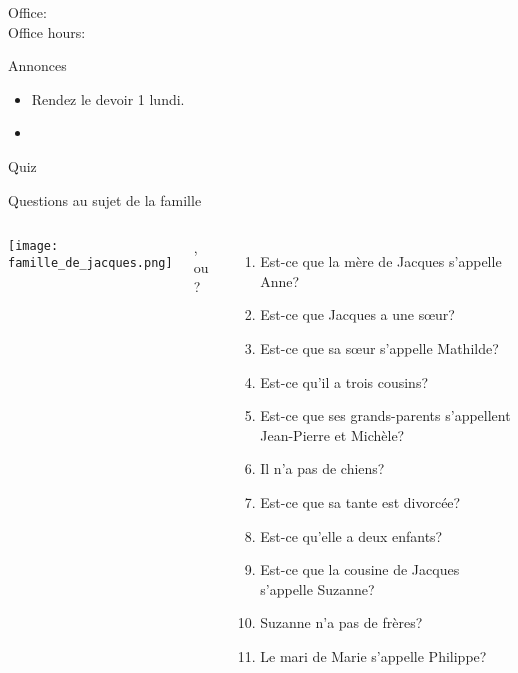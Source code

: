 \documentclass{beamer}
\subtitle[Oui ou non]{Les questions oui ou non}
\begin{document}
  \begin{frame}
    \titlepage
    \tiny{Office: \\
          Office hours: }
  \end{frame}

  \begin{frame}{Annonces}
    \begin{itemize}
      \item Rendez le devoir 1 lundi.
      \item[] 
    \end{itemize}
  \end{frame}

  \begin{frame}{}
    \begin{center}
      \Large Quiz
    \end{center}
  \end{frame}

  \begin{frame}{Questions au sujet de la famille}
    \begin{columns}[T]
        \texttt{[image: famille\_de\_jacques.png]}
        {\scriptsize
          ,  ou ?
          \begin{enumerate}
            \item Est-ce que la mère de Jacques s'appelle Anne?
            \item Est-ce que Jacques a une sœur?
            \item Est-ce que sa sœur s'appelle Mathilde?
            \item Est-ce qu'il a trois cousins?
            \item Est-ce que ses grands-parents s'appellent Jean-Pierre et Michèle?
            \item Il n'a pas de chiens?
            \item Est-ce que sa tante est divorcée?
            \item Est-ce qu'elle a deux enfants?
            \item Est-ce que la cousine de Jacques s'appelle Suzanne?
            \item Suzanne n'a pas de frères?
            \item Le mari de Marie s'appelle Philippe?
          \end{enumerate}
        }
    \end{columns}
  \end{frame}
\end{document}
